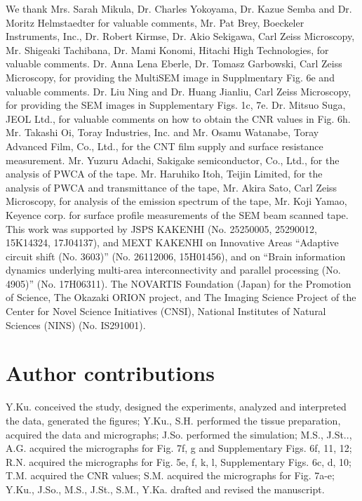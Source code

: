 \documentclass{article}
\begin{document}
We thank Mrs. Sarah Mikula, Dr. Charles Yokoyama, Dr. Kazue Semba and Dr. Moritz Helmstaedter for valuable comments, Mr. Pat Brey, Boeckeler Instruments, Inc., Dr. Robert Kirmse, Dr. Akio Sekigawa, Carl Zeiss Microscopy, Mr. Shigeaki Tachibana, Dr. Mami Konomi, Hitachi High Technologies, for valuable comments. Dr. Anna Lena Eberle, Dr. Tomasz Garbowski, Carl Zeiss Microscopy, for providing the MultiSEM image in Supplmentary Fig. 6e and valuable comments. Dr. Liu Ning and Dr. Huang Jianliu, Carl Zeiss Microscopy, for providing the SEM images in Supplementary Figs. 1c, 7e. Dr. Mitsuo Suga, JEOL Ltd., for valuable comments on how to obtain the CNR values in Fig. 6h. Mr. Takashi Oi, Toray Industries, Inc. and Mr. Osamu Watanabe, Toray Advanced Film, Co., Ltd., for the CNT film supply and surface resistance measurement. Mr. Yuzuru Adachi, Sakigake semiconductor, Co., Ltd., for the analysis of PWCA of the tape. Mr. Haruhiko Itoh, Teijin Limited, for the analysis of PWCA and transmittance of the tape, Mr. Akira Sato, Carl Zeiss Microscopy, for analysis of the emission spectrum of the tape, Mr. Koji Yamao, Keyence corp. for surface profile measurements of the SEM beam scanned tape. This work was supported by JSPS KAKENHI (No. 25250005, 25290012, 15K14324, 17J04137), and MEXT KAKENHI on Innovative Areas “Adaptive circuit shift (No. 3603)” (No. 26112006, 15H01456), and on “Brain information dynamics underlying multi-area interconnectivity and parallel processing (No. 4905)” (No. 17H06311). The NOVARTIS Foundation (Japan) for the Promotion of Science, The Okazaki ORION project, and The Imaging Science Project of the Center for Novel Science Initiatives (CNSI), National Institutes of Natural Sciences (NINS) (No. IS291001).

\section*{Author contributions}

Y.Ku. conceived the study, designed the experiments, analyzed and interpreted the data, generated the figures; Y.Ku., S.H. performed the tissue preparation, acquired the data and micrographs; J.So. performed the simulation; M.S., J.St.., A.G. acquired the micrographs for Fig. 7f, g and Supplementary Figs. 6f, 11, 12; R.N. acquired the micrographs for Fig. 5e, f, k, l, Supplementary Figs. 6c, d, 10; T.M. acquired the CNR values; S.M. acquired the micrographs for Fig. 7a-e; Y.Ku., J.So., M.S., J.St., S.M., Y.Ka. drafted and revised the manuscript.
\end{document}
